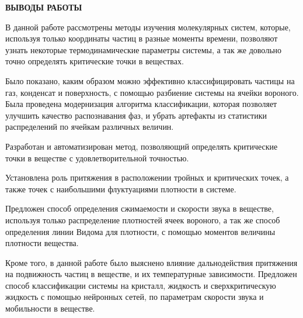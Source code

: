 \newpage
\begin{center}
\textbf{\large ВЫВОДЫ РАБОТЫ}
\end{center}



В данной работе рассмотрены методы изучения молекулярных систем, которые, используя только координаты частиц в разные моменты времени, позволяют узнать некоторые термодинамические параметры системы, а так же довольно точно определять критические точки в веществах. 

Было показано, каким образом можно эффективно классифицировать частицы на газ, конденсат и поверхность, с помощью разбиение системы на ячейки вороного. Была проведена модернизация алгоритма классификации, которая позволяет улучшить качество распознавания фаз, и убрать артефакты из статистики распределений по ячейкам различных величин.

Разработан и автоматизирован метод, позволяющий определять критические точки в веществе с удовлетворительной точностью.

Установлена роль притяжения в расположении тройных и критических точек, а также точек с наибольшими флуктуациями плотности в системе.

Предложен способ определения сжимаемости и скорости звука в веществе, используя только распределение плотностей ячеек вороного, а так же способ определения линии Видома для плотности, с помощью моментов величины плотности вещества.

Кроме того, в данной работе было выяснено влияние дальнодействия притяжения на подвижность частиц в веществе, и их температурные зависимости. Предложен способ классификации системы на кристалл, жидкость и сверхкритическую жидкость с помощью нейронных сетей, по параметрам скорости звука и мобильности в веществе.
